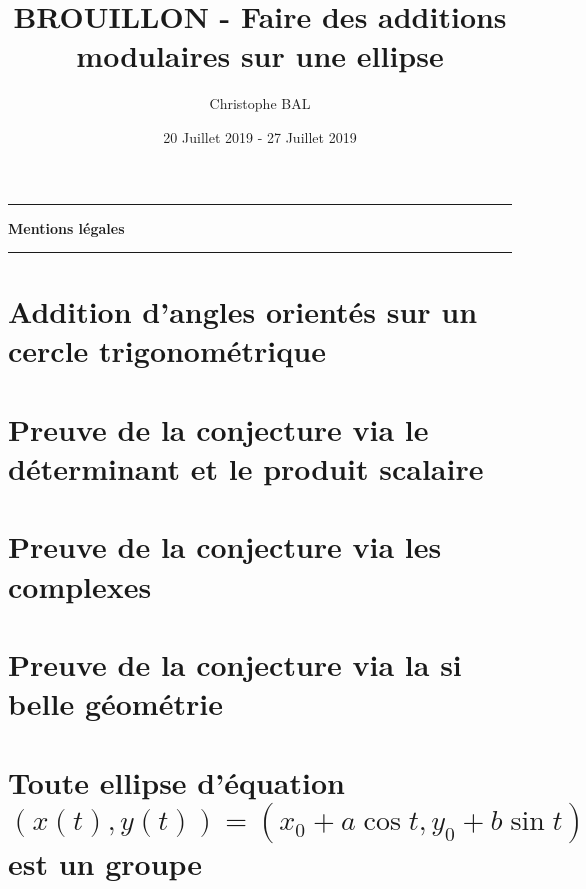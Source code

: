 \documentclass[12pt]{amsart}
\begin{document}
\title{BROUILLON - Faire des additions modulaires sur une ellipse}
\author{Christophe BAL}
\date{20 Juillet 2019 - 27 Juillet 2019}
\maketitle


\begin{center}
	\hrule\vspace{.3em}
	{
		\fontsize{1.35em}{1em}\selectfont
		\textbf{Mentions \og légales \fg}
	}
			
	\vspace{0.45em}
	\doclicenseThis
	\hrule
\end{center}



\setcounter{tocdepth}{2}
\tableofcontents




\newpage
\section{Addition d'angles orientés sur un cercle trigonométrique}






\section{Preuve de la conjecture via le déterminant et le produit scalaire} 






\section{Preuve de la conjecture via les complexes}
                        





\section{Preuve de la conjecture via la si belle géométrie} 






\section{\texorpdfstring{Toute ellipse d'équation $(x(t) , y(t)) = (x_0 + a \cos t , y_0 + b \sin t)$ est un groupe}%
                        {Toute ellipse d'équation (x(t) , y(t)) = (x0 + a cos t , y0 + b sin t) est un groupe}}
      

\end{document}
